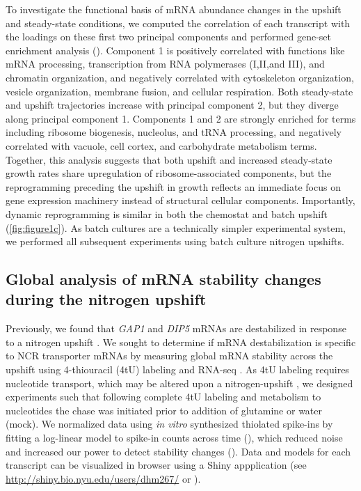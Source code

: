 To investigate the functional basis of mRNA abundance changes
in the upshift and steady-state conditions, we computed the
correlation of each transcript with the loadings on these first two
principal components and performed gene-set enrichment analysis
(). 
Component 1 is positively correlated with functions like
mRNA processing, transcription from RNA polymerases (I,II,and III),
and chromatin organization, and negatively correlated with
cytoskeleton organization,
vesicle organization, membrane fusion, and cellular respiration.
Both steady-state and upshift 
trajectories increase with principal component 2, but they diverge
along principal component 1. Components 1 and 2 are 
strongly enriched for terms including ribosome biogenesis, 
nucleolus, and
tRNA processing, and negatively correlated with
vacuole, cell cortex, and carbohydrate metabolism terms. 
Together, this analysis suggests that both upshift and
increased steady-state growth rates share upregulation of
ribosome-associated components, but the reprogramming
preceding the upshift in growth reflects an immediate focus on 
gene expression machinery instead of structural cellular components.
Importantly,
dynamic reprogramming is similar in both the chemostat and batch
upshift (\autoref{fig:figure1c}). As batch cultures are a technically
simpler experimental system, we performed all subsequent experiments
using batch culture nitrogen upshifts. 

\label{subsec:pcaGoCorr}

\subsection{Global analysis of mRNA stability changes during the
nitrogen upshift}

Previously, we found that \textit{GAP1} and \textit{DIP5} mRNAs 
are destabilized in
response to a nitrogen upshift \parencite{airoldi2016steady}. We sought to
determine if mRNA destabilization is specific to NCR transporter
mRNAs by measuring global mRNA stability across the upshift
using 4-thiouracil (4tU) labeling and RNA-seq 
\parencite{neymotin2014determination,munchel2011dynamic}.
As 4tU labeling requires nucleotide transport, which may be altered
upon a nitrogen-upshift \parencite{hein1995npi1}, we designed experiments such
that following complete 4tU labeling and metabolism to nucleotides 
the chase was initiated prior to addition of glutamine or water (mock).
We normalized data using \textit{in vitro} synthesized thiolated 
spike-ins by fitting a log-linear model to spike-in counts
across time (), which reduced noise and increased
our power to detect stability changes ().
Data and models for each transcript can be visualized in browser
using a Shiny appplication (see
\url{http://shiny.bio.nyu.edu/users/dhm267/} or  ). 

